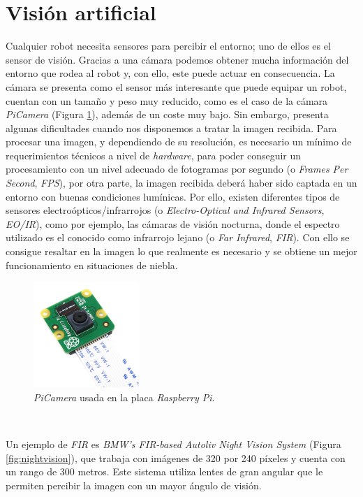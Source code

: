 \section{Visión artificial}
\label{sec:vision}
Cualquier robot necesita sensores para percibir el entorno; uno de ellos es el sensor de visión. Gracias a una cámara podemos obtener mucha información del entorno que rodea al robot y, con ello, este puede actuar en consecuencia. La cámara se presenta como el sensor más interesante que puede equipar un robot, cuentan con un tamaño y peso muy reducido, como es el caso de la cámara \textit{PiCamera} (Figura \ref{fig:picamera}), además de un coste muy bajo. Sin embargo, presenta algunas dificultades cuando nos disponemos a tratar la imagen recibida. Para procesar una imagen, y dependiendo de su resolución, es necesario un mínimo de requerimientos técnicos a nivel de \textit{hardware}, para poder conseguir un procesamiento con un nivel adecuado de fotogramas por segundo (o \textit{Frames Per Second}, \textit{FPS}), por otra parte, la imagen recibida deberá haber sido captada en un entorno con buenas condiciones lumínicas. Por ello, existen diferentes tipos de sensores electroópticos/infrarrojos (o \textit{Electro-Optical and Infrared Sensors}, \textit{EO/IR}), como por ejemplo, las cámaras de visión nocturna, donde el espectro utilizado es el conocido como infrarrojo lejano (o \textit{Far Infrared}, \textit{FIR}). Con ello se consigue resaltar en la imagen lo que realmente es necesario y se obtiene un mejor funcionamiento en situaciones de niebla.\\

\begin{figure} [h!]
	\begin{center}
		\includegraphics[width=4cm]{figs/picamera}
	\end{center}
	\caption{\textit{PiCamera} usada en la placa \textit{Raspberry Pi}.}
	\label{fig:picamera}
\end{figure}\

Un ejemplo de \textit{FIR} es \textit{BMW's FIR-based Autoliv Night Vision System} \cite{nightvision} (Figura \ref{fig:nightvision}), que trabaja con imágenes de 320 por 240 píxeles y cuenta con un rango de 300 metros. Este sistema utiliza lentes de gran angular que le permiten percibir la imagen con un mayor ángulo de visión.\\

